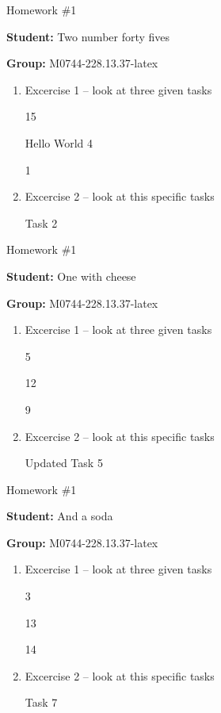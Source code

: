 \documentclass[12pt, fleqn, a4paper]{article}
\newcommand{\preamble}{\lipsum[1]}
\newcommand{\generatepage}[4]{
	\begin{center}
		{\Large #1}

		\textbf{Student:} #2

		\textbf{Group:} #3

	\end{center}

	\vspace{10pt}

	\preamble

	\begin{enumerate}
		#4
	\end{enumerate}

	\pagebreak
}
\begin{document}
	\generatepage{Homework \#1}{Two number forty fives}{M0744-228.13.37-latex}{
		\item Excercise 1 -- look at three given tasks

			15

			Hello World 4

			1
		\item Excercise 2 -- look at this specific tasks

			Task 2
	}

	\generatepage{Homework \#1}{One with cheese}{M0744-228.13.37-latex}{
		\item Excercise 1 -- look at three given tasks

			5

			12

			9
		\item Excercise 2 -- look at this specific tasks

			Updated Task 5
	}

	\generatepage{Homework \#1}{And a {\LARGE soda}}{M0744-228.13.37-latex}{
		\item Excercise 1 -- look at three given tasks

			3

			13

			14
		\item Excercise 2 -- look at this specific tasks

			Task 7
	}
\end{document}
